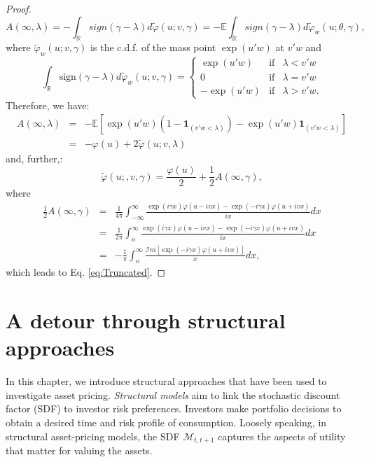 \documentclass[
  12pt,
]{book}
\theoremstyle{definition}
\theoremstyle{definition}
\theoremstyle{definition}
\theoremstyle{definition}
\theoremstyle{remark}
\begin{document}
\begin{proof}
\[
A(\infty,\lambda) = -  \int_{\mathbb{R}} sign(\gamma-\lambda)d\tilde{\varphi}(u;v,\gamma) = -\mathbb{E}  \int_{\mathbb{R}} sign(\gamma-\lambda)d\tilde{\varphi}_w(u;\theta,\gamma),
\]
where \(\tilde{\varphi}_w(u;v,\gamma)\) is the c.d.f. of the mass point \(\exp(u'w)\) at \(v'w\) and
\[
\int_{\mathbb{R}} \mbox{sign}(\gamma-\lambda)d\tilde{\varphi}_w(u;v,\gamma)=
\left\{
\begin{array}{ccc}
\exp(u'w) & \mbox{if} & \lambda < v'w \\
0 & \mbox{if}& \lambda = v'w \\
-\exp(u'w) & \mbox{if} & \lambda > v'w.
\end{array}
\right.
\]
Therefore, we have:
\begin{eqnarray*}
A(\infty,\lambda) & =& - \mathbb{E}[\exp(u'w)(1-\textbf{1}_{(v'w<\lambda)})-\exp(u'w)\textbf{1}_{(v'w<\lambda)}] \\
& =& - \varphi(u) + 2\tilde{\varphi}(u;v,\lambda)
\end{eqnarray*}
and, further,:
\[
\tilde{\varphi}(u;,v,\gamma) =  \frac{\varphi(u)}{2} +  \frac{1}{2} A(\infty,\gamma),
\]
where
\begin{eqnarray*}
\frac{1}{2} A(\infty,\gamma) & =&  \frac{1}{4\pi} \int^{\infty}_{-\infty}  \frac{\exp(i\gamma x)\varphi(u-ivx)-\exp(-i\gamma x)\varphi(u+ivx)}{ix} dx \\
& =&  \frac{1}{2\pi} \int^{\infty}_{o}  \frac{\exp(i\gamma x)\varphi(u-ivx)-\exp(-i\gamma x)\varphi(u+ivx)}{ix} dx \\
& =& -  \frac{1}{\pi} \int^{\infty}_{o}  \frac{{\mathcal I}m[\exp(-i\gamma x)\varphi(u+ivx)]}{x}dx,
\end{eqnarray*}
which leads to Eq. \eqref{eq:Truncated}.
\end{proof}

\hypertarget{Structural}{%
\chapter{A detour through structural approaches}\label{Structural}}

In this chapter, we introduce structural approaches that have been used to investigate asset pricing. \emph{Structural models} aim to link the stochastic discount factor (SDF) to investor risk preferences. Investors make portfolio decisions to obtain a desired time and risk profile of consumption. Loosely speaking, in structural asset-pricing models, the SDF \(\mathcal{M}_{t,t+1}\) captures the aspects of utility that matter for valuing the assets.
\end{document}
